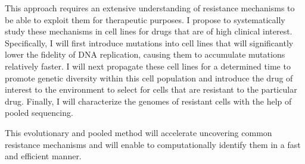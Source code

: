 \documentclass[11pt,letterpaper]{article}
\begin{document}
This approach requires an extensive understanding of resistance mechanisms to be able to exploit them for therapeutic purposes.
I propose to systematically study these mechanisms in cell lines for drugs that are of high clinical interest.
Specifically, I will first introduce mutations into cell lines that will significantly lower the fidelity of DNA replication,
causing them to accumulate mutations relatively faster.
I will next propagate these cell lines for a determined time to promote genetic diversity within this cell population
and introduce the drug of interest to the environment to select for cells that are resistant to the particular drug.
Finally, I will characterize the genomes of resistant cells with the help of pooled sequencing.

This evolutionary and pooled method will accelerate uncovering common resistance mechanisms
and will enable to computationally identify them in a fast and efficient manner.

\clearpage

\footnotesize{
{}
}
\end{document}
